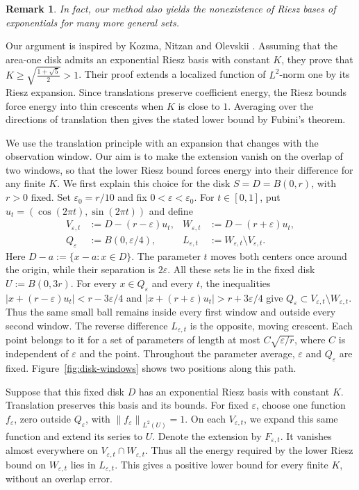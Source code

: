 \documentclass[10pt,a4paper]{amsart}
\newtheorem{remark}{Remark}[section]
\newcommand\1{\mathbbm{1}}
\newcommand\Norm[2]{\left\|#1\right\|_{#2}}
\newcommand{\eps}{\varepsilon}
\begin{document}
\begin{remark}\label{rem:more-general-sets}
In fact, our method also yields the nonexistence of Riesz bases of exponentials
for many more general sets.
\end{remark}

Our argument is inspired by Kozma, Nitzan and Olevskii \cite{KNO23}.
Assuming that the area-one disk admits an exponential Riesz basis with constant $K$,
they prove that $K\ge\sqrt{\frac{1+\sqrt{5}}{2}}>1$.
Their proof extends a localized function of $L^2$-norm one by its Riesz expansion.
Since translations preserve coefficient energy, the Riesz bounds force energy
into thin crescents when $K$ is close to $1$. Averaging over the directions
of translation then gives the stated lower bound by Fubini's theorem.

We use the translation principle with an expansion that changes with the
observation window. Our aim is to make the extension vanish on the overlap
of two windows, so that the lower Riesz bound forces energy into their
difference for any finite $K$. We first explain this choice for the disk
$S=D=B(0,r)$, with $r>0$ fixed. Set $\eps_0=r/10$ and fix
$0<\eps<\eps_0$. For $t\in[0,1]$, put
$u_t=(\cos(2\pi t),\sin(2\pi t))$ and define
\begin{equation*}
    \begin{aligned}
        V_{\eps,t}&:=D-(r-\eps)u_t,
        &W_{\eps,t}&:=D-(r+\eps)u_t,\\
        Q_\eps&:=B(0,\eps/4),
        &L_{\eps,t}&:=W_{\eps,t}\setminus V_{\eps,t}.
    \end{aligned}
\end{equation*}
Here $D-a:=\{x-a:x\in D\}$. The parameter $t$ moves both centers once around
the origin, while their separation is $2\eps$. All these sets lie in the fixed
disk $U:=B(0,3r)$. For every $x\in Q_\eps$ and every $t$, the inequalities
$|x+(r-\eps)u_t|<r-3\eps/4$ and $|x+(r+\eps)u_t|>r+3\eps/4$ give
$Q_\eps\subset V_{\eps,t}\setminus W_{\eps,t}$.
Thus the same small ball remains inside every first window and outside every
second window. The reverse difference $L_{\eps,t}$ is the opposite, moving
crescent. Each point belongs to it for a set of parameters of length at most
$C\sqrt{\eps/r}$, where $C$ is independent of $\eps$ and the point.
Throughout the parameter average, $\eps$ and $Q_\eps$ are fixed.
Figure~\ref{fig:disk-windows} shows two positions along this path.

Suppose that this fixed disk $D$ has an exponential Riesz basis with constant $K$.
Translation preserves this basis and its bounds. For fixed $\eps$, choose
one function $f_\eps$, zero outside $Q_\eps$, with $\Norm{f_\eps}{L^2(U)}=1$.
On each $V_{\eps,t}$, we expand this same function and extend its series to $U$.
Denote the extension by $F_{\eps,t}$.
It vanishes almost everywhere on $V_{\eps,t}\cap W_{\eps,t}$.
Thus all the energy required by the lower Riesz bound on $W_{\eps,t}$ lies
in $L_{\eps,t}$.
This gives a positive lower bound for every finite $K$, without an overlap error.
\end{document}
